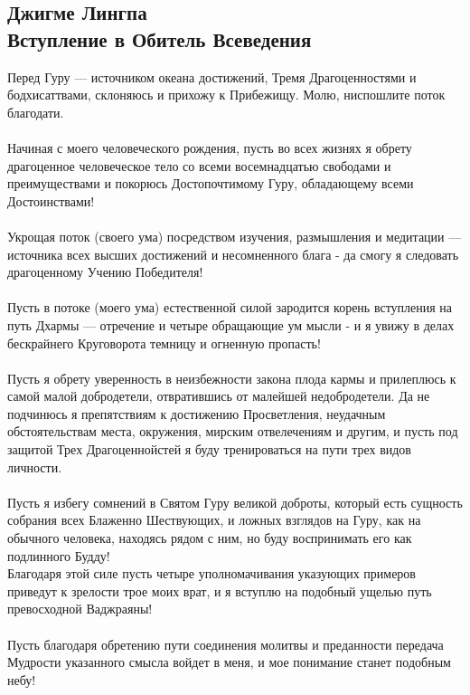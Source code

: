 \newpage
\subsection{Джигме Лингпа\\Вступление в Обитель Всеведения}

Перед Гуру — источником океана достижений,
Тремя Драгоце\-нностями и бодхисаттвами,
склоняюсь и прихожу к Прибежищу.
Молю, ниспошлите поток благодати.\\
\\
Начиная с моего человеческого рождения,
пусть во всех жизнях я обрету драгоценное человеческое тело
со всеми восемнадцатью свободами и преимуществами
и покорюсь Дос\-топочтимому Гуру,
обладающему всеми Достоинствами!\\
\\
Укрощая поток (своего ума) посредством изучения,
размышле\-ния и медитации — источника всех
высших достижений и несомненного блага -
да смогу я следовать драгоценному Учению Победителя!\\
\\
Пусть в потоке (моего ума) естественной силой
зародится корень вступления на путь Дхармы —
отречение и четыре обращающие ум мысли -
и я увижу в делах бескрайнего Круго\-ворота
темницу и огненную пропасть!\\
\\
Пусть я обрету уверенность в неизбежности закона плода кармы
и прилеплюсь к самой малой добродетели,
отвратившись от малейшей недобродетели.
Да не подчинюсь я препятствиям к достижению Просветления,
неудачным обстоятельствам места, окружения,
мирским отвелечениям и другим, и пусть под защитой
Трех Драгоценнойстей я буду тренироваться на пути трех видов личности.\\
\\
Пусть я избегу сомнений в Святом Гуру великой доброты,
который есть сущность собрания всех Блаженно Шествующих,
и ложных взглядов на Гуру, как на обычного человека,
находясь рядом с ним, но буду воспринимать его как подлинного Будду!
\\
Благодаря этой силе пусть четыре уполномачивания
указующих примеров приведут к зрелости трое моих врат,
и я вступлю на подобный ущелью путь превосходной Ваджраяны!\\
\\
Пусть благодаря обретению пути соединения молитвы и преда\-нности
передача Мудрости указанного смысла войдет в меня,
и мое понимание станет подобным небу!\\
\\
